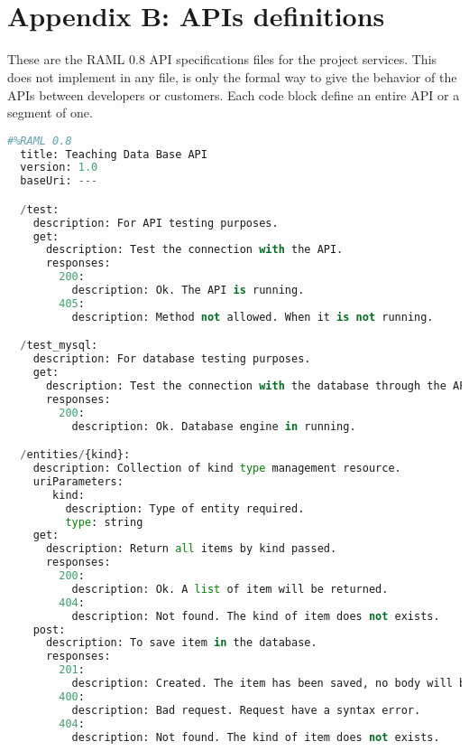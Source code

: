 \section{\\Appendix B: APIs definitions}

These are the RAML 0.8 API specifications files for the project services.
This does not implement in any file, is only the formal way to give the behavior
of the APIs between developers or customers. Each code block define an entire
API or a segment of one.

\begin{lstlisting}[language=python,frame=none]
  #%RAML 0.8
  title: Teaching Data Base API
  version: 1.0
  baseUri: ---

  /test:
    description: For API testing purposes.
    get:
      description: Test the connection with the API.
      responses:
        200:
          description: Ok. The API is running.
        405:
          description: Method not allowed. When it is not running.

  /test_mysql:
    description: For database testing purposes.
    get:
      description: Test the connection with the database through the API.
      responses:
        200:
          description: Ok. Database engine in running.

  /entities/{kind}:
    description: Collection of kind type management resource.
    uriParameters:
       kind:
         description: Type of entity required.
         type: string
    get:
      description: Return all items by kind passed.
      responses:
        200:
          description: Ok. A list of item will be returned.
        404:
          description: Not found. The kind of item does not exists.
    post:
      description: To save item in the database.
      responses:
        201:
          description: Created. The item has been saved, no body will be returned.
        400:
          description: Bad request. Request have a syntax error.
        404:
          description: Not found. The kind of item does not exists.


\end{lstlisting}
